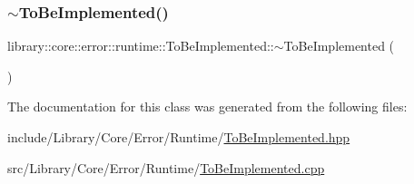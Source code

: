 \mbox{\label{classlibrary_1_1core_1_1error_1_1runtime_1_1_to_be_implemented_a4d6d8204b46f1f5eb41458849a891787}} 
\subsubsection{\texorpdfstring{$\sim$ToBeImplemented()}{~ToBeImplemented()}}
{\footnotesize\ttfamily library\+::core\+::error\+::runtime\+::\+To\+Be\+Implemented\+::$\sim$\+To\+Be\+Implemented (\begin{DoxyParamCaption}{ }\end{DoxyParamCaption})}



The documentation for this class was generated from the following files\+:\begin{DoxyCompactItemize}
\item 
include/\+Library/\+Core/\+Error/\+Runtime/\mbox{\hyperlink{_to_be_implemented_8hpp}{To\+Be\+Implemented.\+hpp}}\item 
src/\+Library/\+Core/\+Error/\+Runtime/\mbox{\hyperlink{_to_be_implemented_8cpp}{To\+Be\+Implemented.\+cpp}}\end{DoxyCompactItemize}

